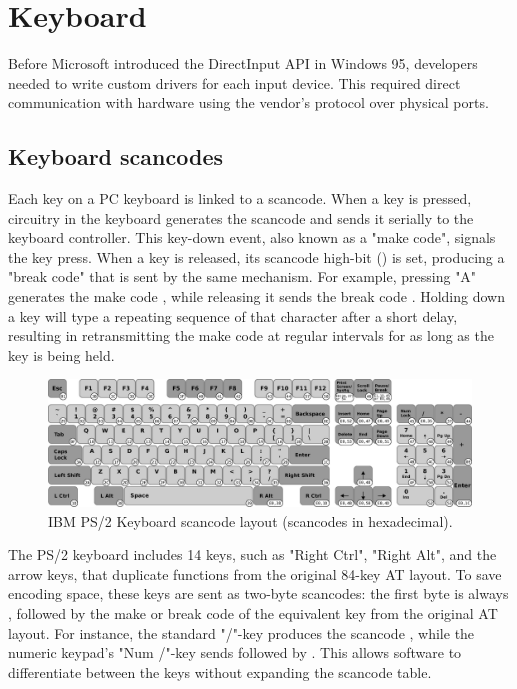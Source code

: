 \documentclass[book.tex]{subfiles}
\begin{document}
\pagebreak
\section{Keyboard}
Before Microsoft introduced the DirectInput API in Windows 95, developers needed to write custom drivers for each input device. This required direct communication with hardware using the vendor's protocol over physical ports. 


\subsection{Keyboard scancodes}
\par
Each key on a PC keyboard is linked to a scancode. When a key is pressed, circuitry in the keyboard generates the scancode and sends it serially to the keyboard controller. This key-down event, also known as a "make code", signals the key press. When a key is released, its scancode high-bit () is set, producing a "break code" that is sent by the same mechanism. For example, pressing "A" generates the make code , while releasing it sends the break code . Holding down a key will type a repeating sequence of that character after a short delay, resulting in retransmitting the make code at regular intervals for as long as the key is being held.\\

\begin{figure}[H]
\centering
      \includegraphics[width=1.0\textwidth]{imgs/drawings/keyboard_model_M.eps}
      \caption{IBM PS/2 Keyboard scancode layout (scancodes in hexadecimal).}
\end{figure}

\par
The PS/2 keyboard includes 14 keys, such as "Right Ctrl", "Right Alt", and the arrow keys, that duplicate functions from the original 84-key AT layout. To save encoding space, these keys are sent as two-byte scancodes: the first byte is always , followed by the make or break code of the equivalent key from the original AT layout. For instance, the standard "/"-key produces the scancode , while the numeric keypad's "Num /"-key sends  followed by . This allows software to differentiate between the keys without expanding the scancode table.\\
\end{document}
